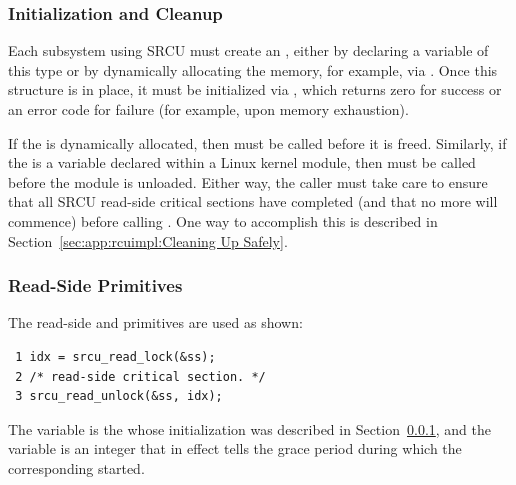 \subsubsection{Initialization and Cleanup}
\label{sec:app:rcuimpl:Initialization and Cleanup}

Each subsystem using SRCU must create an
 ,
either by declaring a variable of this type or by
dynamically allocating the memory, for example, via .
Once this structure is in place, it must be initialized via
, which returns zero for success or an error
code for failure (for example, upon memory exhaustion).

If the   is dynamically allocated, then
 must be called before it is freed.
Similarly, if the   is a variable declared within
a Linux kernel module, then  must be called
before the module is unloaded.
Either way, the caller must take care to ensure that all SRCU read-side
critical sections have completed (and that no more will commence) before
calling .
One way to accomplish this is described in
Section~\ref{sec:app:rcuimpl:Cleaning Up Safely}.

\subsubsection{Read-Side Primitives}
\label{sec:app:rcuimpl:Read-Side Primitives}

The read-side  and  primitives
are used as shown:

\vspace{5pt}
\begin{minipage}[t]{\columnwidth}
\scriptsize
\begin{verbatim}
 1 idx = srcu_read_lock(&ss);
 2 /* read-side critical section. */
 3 srcu_read_unlock(&ss, idx);
\end{verbatim}
\end{minipage}
\vspace{5pt}

The  variable is the   whose initialization
was described in Section~\ref{sec:app:rcuimpl:Initialization and Cleanup},
and the  variable is an integer that in effect tells
 the grace period during which the corresponding
 started.

